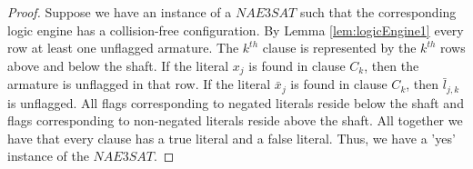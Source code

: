 \begin{proof}
Suppose we have an instance of a $NAE3SAT$ such that the corresponding logic engine has a 
collision-free configuration. By Lemma \ref{lem:logicEngine1} every row at least one unflagged 
armature.  The $k^{th}$ clause is represented by the $k^{th}$ rows above and below the shaft. If the 
literal $x_j$ is found in clause $C_k$, then the armature is unflagged in that row. If the literal 
$\bar{x}_j$ is found in clause $C_k$, then $\bar{l}_{j,k}$ is unflagged.  All flags 
corresponding to negated literals reside below the shaft and flags corresponding to non-negated 
literals reside above the shaft.  All together we have that every clause has a true literal and a 
false literal.  Thus, we have a 'yes' instance of the $NAE3SAT$.
%
%
%
\end{proof}

